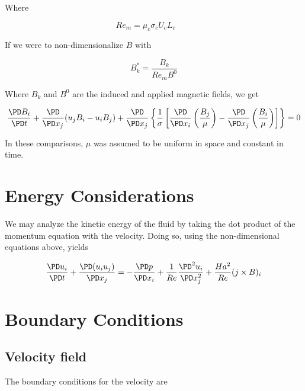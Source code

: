 \documentclass[11pt]{article}
\begin{document}
Where

\begin{equation}
	Re_m = \mu_c \sigma_c U_c L_c \qquad
\end{equation}

If we were to non-dimensionalize $B$ with

\begin{equation}
	B_k^* = \frac{B_k}{Re_m B^0}
\end{equation}

Where $B_k$ and $B^0$ are the induced and applied magnetic fields, we get

\begin{equation}
	\frac{\PD B_i}{\PD t}
	+ \frac{\PD}{\PD x_j} (u_j B_i - u_i B_j)
	+
	\frac{\PD}{\PD x_j}
	\left\{ \frac{1}{\sigma}
	\left[
	\frac{\PD}{\PD x_i}
	\left( \frac{B_j}{\mu} \right) -
	\frac{\PD}{\PD x_j}
	\left( \frac{B_i}{\mu} \right)
	\right]
	\right\} = 0
\end{equation}


In these comparisons, $\mu$ was assumed to be uniform in space and constant in time.


\section{Energy Considerations}
We may analyze the kinetic energy of the fluid by taking the dot product of the momentum equation with the velocity. Doing so, using the non-dimensional equations above, yields

\begin{equation}
	\frac{\PD u_i}{\PD t} +
	\frac{\PD (u_i u_j)}{\PD x_j}
	=
	- \frac{\PD p}{\PD x_i}
	+ \frac{1}{Re}
	\frac{\PD^2 u_i}{\PD x_j^2}
	+ \frac{Ha^2}{Re}
	(j \times B)_i
\end{equation}



\section{Boundary Conditions}

\subsection{Velocity field}
The boundary conditions for the velocity are
\end{document}
